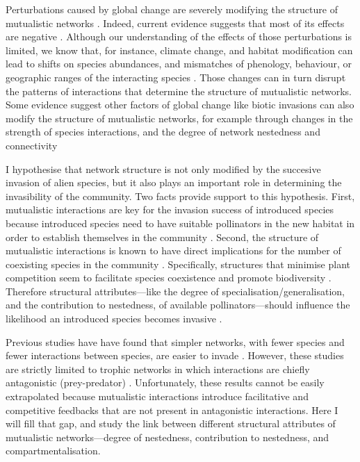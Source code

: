 \documentclass[a4paper]{article}
\begin{document}
Perturbations caused by global change are severely modifying the structure of mutualistic networks \autocite{Burkle2013a}.
Indeed, current evidence suggests that most of its effects are negative \autocite{Tylianakis2008, Tylianakis2010}.
Although our understanding of the effects of those perturbations is limited, we know that, for instance, climate change, and habitat modification can lead to shifts on species abundances, and mismatches of phenology, behaviour, or geographic ranges of the interacting species \autocite{Memmott2007, Tylianakis2008, Hegland2009, Burkle2013a}.
Those changes can in turn disrupt the patterns of interactions that determine the structure of mutualistic networks.
Some evidence suggest other factors of global change like biotic invasions can also modify the structure of mutualistic networks, for example through changes in the strength of species interactions, and the degree of network nestedness and connectivity \autocite{Olesen2002, Aizen2008, Bartomeus2008, Vila2009, Traveset2013}

I hypothesise that network structure is not only modified by the succesive invasion of alien species, but it also plays an important role in determining the invasibility of the community.
Two facts provide support to this hypothesis.
First, mutualistic interactions are key for the invasion success of introduced species because introduced species need to have suitable pollinators in the new habitat in order to establish themselves in the community \autocite{Richardson2000, Sargent2008}.
Second, the structure of mutualistic interactions is known to have direct implications for the number of coexisting species in the community \autocite{Moeller2004, Bascompte2006, Bascompte2007, Bastolla2009}.
Specifically, structures that minimise plant competition seem to facilitate species coexistence and promote biodiversity \autocite{Bastolla2009}.
Therefore structural attributes---like the degree of specialisation/generalisation, and the contribution to nestedness, of available pollinators---should influence the likelihood an introduced species becomes invasive \autocite{Stouffer2014}.

Previous studies have have found that simpler networks, with fewer species and fewer interactions between species, are easier to invade \autocite{Romanuk2009, Galiana2014}.
However, these studies are strictly limited to trophic networks in which interactions are chiefly antagonistic (prey-predator) \autocite{Romanuk2009, Baiser2010, Galiana2014}.
Unfortunately, these results cannot be easily extrapolated because mutualistic interactions introduce facilitative and competitive feedbacks that are not present in antagonistic interactions.
Here I will fill that gap, and study the link between different structural attributes of mutualistic networks---degree of nestedness, contribution to nestedness, and compartmentalisation.
\end{document}
